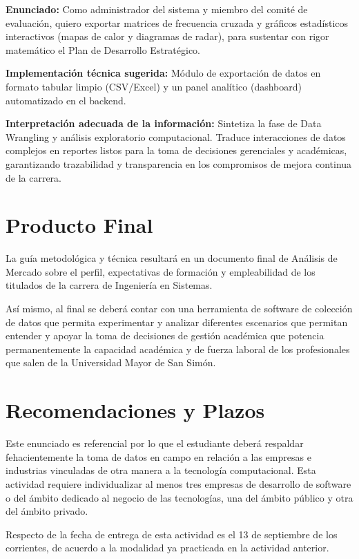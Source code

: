 \documentclass[12pt]{article}
\begin{document}
\textbf{Enunciado:} Como administrador del sistema y miembro del comité de
evaluación, quiero exportar matrices de frecuencia cruzada y gráficos
estadísticos interactivos (mapas de calor y diagramas de radar), para
sustentar con rigor matemático el Plan de Desarrollo Estratégico.

\textbf{Implementación técnica sugerida:} Módulo de exportación de datos
en formato tabular limpio (CSV/Excel) y un panel analítico (dashboard)
automatizado en el backend.

\textbf{Interpretación adecuada de la información:} Sintetiza la fase de
Data Wrangling y análisis exploratorio computacional. Traduce
interacciones de datos complejos en reportes listos para la toma de
decisiones gerenciales y académicas, garantizando trazabilidad y
transparencia en los compromisos de mejora continua de la carrera.

\section{Producto Final}

La guía metodológica y técnica resultará en un documento final de Análisis
de Mercado sobre el perfil, expectativas de formación y empleabilidad de
los titulados de la carrera de Ingeniería en Sistemas.

Así mismo, al final se deberá contar con una herramienta de software de
colección de datos que permita experimentar y analizar diferentes
escenarios que permitan entender y apoyar la toma de decisiones de gestión
académica que potencia permanentemente la capacidad académica y de fuerza
laboral de los profesionales que salen de la Universidad Mayor de San
Simón.

\section{Recomendaciones y Plazos}

Este enunciado es referencial por lo que el estudiante deberá respaldar
fehacientemente la toma de datos en campo en relación a las empresas e
industrias vinculadas de otra manera a la tecnología computacional. Esta
actividad requiere individualizar al menos tres empresas de desarrollo de
software o del ámbito dedicado al negocio de las tecnologías, una del
ámbito público y otra del ámbito privado.

Respecto de la fecha de entrega de esta actividad es el 13 de septiembre
de los corrientes, de acuerdo a la modalidad ya practicada en la actividad
anterior.
\end{document}

